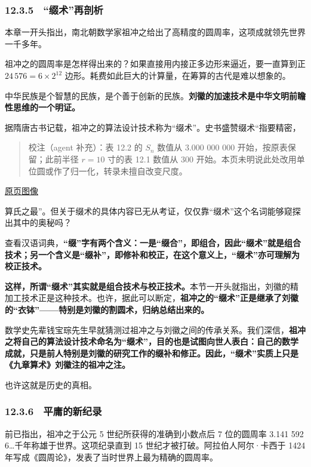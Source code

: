 \documentclass[
  10pt,
  fontset=fandol]{ctexart}
\begin{document}
\subsubsection{12.3.5　``缀术''再剖析}\label{ux7f00ux672fux518dux5256ux6790}

本章一开头指出，南北朝数学家祖冲之给出了高精度的圆周率，这项成就领先世界一千多年。

祖冲之的圆周率是怎样得出来的？如果直接用内接正多边形来逼近，要一直算到正 \(24\,576=6\times2^{12}\) 边形。耗费如此巨大的计算量，在筹算的古代是难以想象的。

中华民族是个智慧的民族，是个善于创新的民族。\textbf{刘徽的加速技术是中华文明前瞻性思维的一个明证。}

据隋唐古书记载，祖冲之的算法设计技术称为``缀术''。史书盛赞缀术``指要精密，

\begin{quote}
校注（agent 补充）：表 12.2 的 \(S_n\) 数值从 3.000 000 000 开始，按原表保留；此前半径 \(r=10\) 寸的表 12.1 数值从 300 开始。本页未明说此处改用单位圆或作了归一化，转录未擅自改变尺度。
\end{quote}

\href{../../source-images/pdf-302.jpeg}{原页图像}

算氏之最''。但关于缀术的具体内容已无从考证，仅仅靠``缀术''这个名词能够窥探出其中的奥秘吗？

查看汉语词典，\textbf{``缀''字有两个含义：一是``缀合''，即组合，因此``缀术''就是组合技术；另一个含义是``缀补''，即修补和校正，在这个意义上，``缀术''亦可理解为校正技术。}

\textbf{这样，所谓``缀术''其实就是组合技术与校正技术。}本节一开头就指出，刘徽的精加工技术正是这种技术。也许，据此可以断定，\textbf{祖冲之的``缀术''正是继承了刘徽的``衣钵''------特别是刘徽的割圆术，归纳总结出来的。}

数学史先辈钱宝琮先生早就猜测过祖冲之与刘徽之间的传承关系。我们深信，\textbf{祖冲之将自己的算法设计技术命名为``缀术''，目的也是试图向世人表白：自己的数学成就，只是前人特别是刘徽的研究工作的缀补和修正。因此，``缀术''实质上只是《九章算术》刘徽注的祖冲之注。}

也许这就是历史的真相。

\subsubsection{12.3.6　平庸的新纪录}\label{ux5e73ux5eb8ux7684ux65b0ux7eaaux5f55}

前已指出，祖冲之于公元 5 世纪所获得的准确到小数点后 7 位的圆周率 3.141 592 6\ldots 千年称雄于世界。这项纪录直到 15 世纪才被打破。阿拉伯人阿尔·卡西于 1424 年写成《圆周论》，发表了当时世界上最为精确的圆周率。
\end{document}
